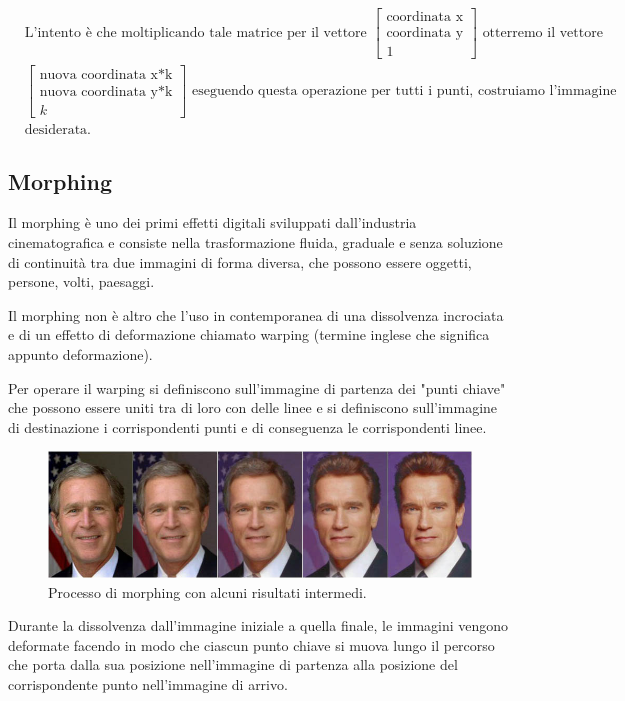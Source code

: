 \vspace{1em}

\begin{align*}
&\text{L'intento è che moltiplicando tale matrice per il vettore  }
\begin{bmatrix}
\text{coordinata x}\\
\text{coordinata y}\\
1
\end{bmatrix}
\text{ otterremo il vettore}\\
&\begin{bmatrix}
\text{nuova coordinata x*k}\\
\text{nuova coordinata y*k}\\
k
\end{bmatrix}
\text{ eseguendo questa operazione per tutti i punti, costruiamo l'immagine}\\
&\text{desiderata.}
\end{align*}

\subsection{Morphing}
Il morphing è uno dei primi effetti digitali sviluppati dall'industria cinematografica e consiste nella trasformazione fluida, graduale e senza soluzione di continuità tra due immagini di forma diversa, che possono essere oggetti, persone, volti, paesaggi.\\

\vspace{1em}

Il morphing non è altro che l'uso in contemporanea di una dissolvenza incrociata e di un effetto di deformazione chiamato warping (termine inglese che significa appunto deformazione).\\

\vspace{1em}

Per operare il warping si definiscono sull'immagine di partenza dei "punti chiave" che possono essere uniti tra di loro con delle linee e si definiscono sull'immagine di destinazione i corrispondenti punti e di conseguenza le corrispondenti linee.\\ 

\begin{figure}[htb] \centering
\includegraphics[scale=0.5, trim = 0 1.1cm 0 0, clip]{Pictures/Striscia_morphing.jpg}
\caption{Processo di morphing con alcuni risultati intermedi.}\label{fig:figura}
\end{figure}

Durante la dissolvenza dall'immagine iniziale a quella finale, le immagini vengono deformate facendo in modo che ciascun punto chiave si muova lungo il percorso che porta dalla sua posizione nell'immagine di partenza alla posizione del corrispondente punto nell'immagine di arrivo. 